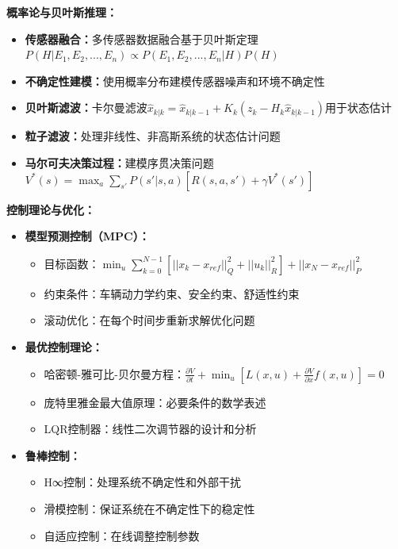 \textbf{概率论与贝叶斯推理：}
\begin{itemize}
\item \textbf{传感器融合：}多传感器数据融合基于贝叶斯定理$P(H|E_1, E_2, ..., E_n) \propto P(E_1, E_2, ..., E_n|H)P(H)$
\item \textbf{不确定性建模：}使用概率分布建模传感器噪声和环境不确定性
\item \textbf{贝叶斯滤波：}卡尔曼滤波$\hat{x}_{k|k} = \hat{x}_{k|k-1} + K_k(z_k - H_k\hat{x}_{k|k-1})$用于状态估计
\item \textbf{粒子滤波：}处理非线性、非高斯系统的状态估计问题
\item \textbf{马尔可夫决策过程：}建模序贯决策问题$V^*(s) = \max_a \sum_{s'} P(s'|s,a)[R(s,a,s') + \gamma V^*(s')]$
\end{itemize}

\textbf{控制理论与优化：}
\begin{itemize}
\item \textbf{模型预测控制（MPC）：}
\begin{itemize}
\item 目标函数：$\min_{u} \sum_{k=0}^{N-1} [||x_k - x_{ref}||_Q^2 + ||u_k||_R^2] + ||x_N - x_{ref}||_P^2$
\item 约束条件：车辆动力学约束、安全约束、舒适性约束
\item 滚动优化：在每个时间步重新求解优化问题
\end{itemize}
\item \textbf{最优控制理论：}
\begin{itemize}
\item 哈密顿-雅可比-贝尔曼方程：$\frac{\partial V}{\partial t} + \min_u [L(x,u) + \frac{\partial V}{\partial x}f(x,u)] = 0$
\item 庞特里雅金最大值原理：必要条件的数学表述
\item LQR控制器：线性二次调节器的设计和分析
\end{itemize}
\item \textbf{鲁棒控制：}
\begin{itemize}
\item H∞控制：处理系统不确定性和外部干扰
\item 滑模控制：保证系统在不确定性下的稳定性
\item 自适应控制：在线调整控制参数
\end{itemize}
\end{itemize}

